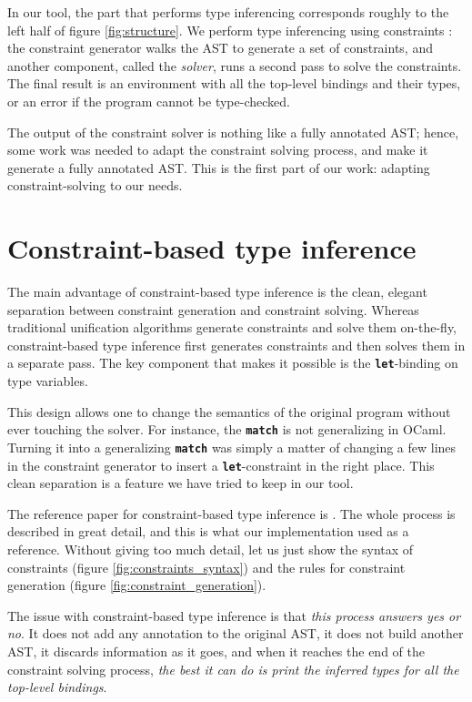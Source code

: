 \documentclass[10pt,a4paper,twoside,titlepage,twocolumn]{article}
\newcommand{\code}[1]{\textbf{\texttt{#1}}}
\begin{document}
In our tool, the part that performs type inferencing corresponds roughly to the
left half of figure \ref{fig:structure}. We perform type inferencing using
constraints \cite{pottier2005essence}: the constraint generator walks the AST to
generate a set of constraints, and another component, called the \emph{solver},
runs a second pass to solve the constraints. The final result is an environment
with all the top-level bindings and their types, or an error if the program
cannot be type-checked.

The output of the constraint solver is nothing like a fully annotated AST;
hence, some work was needed to adapt the constraint solving process, and make it
generate a fully annotated AST. This is the first part of our work: adapting
constraint-solving to our needs.

\section{Constraint-based type inference}

The main advantage of constraint-based type inference is the clean, elegant
separation between constraint generation and constraint solving. Whereas
traditional unification algorithms generate constraints and solve them
on-the-fly, constraint-based type inference first generates constraints and then
solves them in a separate pass. The key component that makes it possible is the
\code{let}-binding on type variables.

This design allows one to change the semantics of the original program without
ever touching the solver. For instance, the \code{match} is not generalizing in
OCaml. Turning it into a generalizing \code{match} was simply a matter of
changing a few lines in the constraint generator to insert a
\code{let}-constraint in the right place. This clean separation is a feature we
have tried to keep in our tool.

The reference paper for constraint-based type inference is
\cite{pottier2005essence}. The whole process is described in great detail, and
this is what our implementation used as a reference. Without giving too much
detail, let us just show the syntax of constraints (figure
\vref{fig:constraints_syntax}) and the rules for constraint generation (figure
\vref{fig:constraint_generation}).

The issue with constraint-based type inference is that \emph{this process
answers yes or no}. It does not add any annotation to the original AST, it does
not build another AST, it discards information as it goes, and when it reaches
the end of the constraint solving process, \emph{the best it can do is print the
inferred types for all the top-level bindings}.
\end{document}
